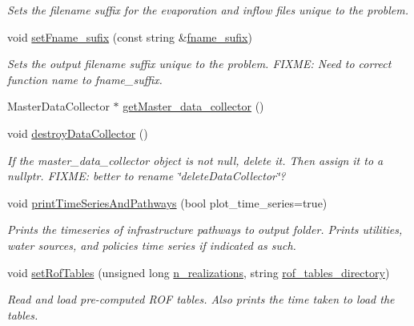 \begin{DoxyCompactItemize}
\begin{DoxyCompactList}\small\item\em Sets the filename suffix for the evaporation and inflow files unique to the problem. \end{DoxyCompactList}\item 
void \mbox{\hyperlink{classProblem_ad666ae2c231f49103593a7e03a3b58fd}{set\+Fname\+\_\+sufix}} (const string \&\mbox{\hyperlink{classProblem_a59444139a907aaf4c6159caed46c8118}{fname\+\_\+sufix}})
\begin{DoxyCompactList}\small\item\em Sets the output filename suffix unique to the problem. F\+I\+X\+ME\+: Need to correct function name to fname\+\_\+suffix. \end{DoxyCompactList}\item 
Master\+Data\+Collector $\ast$ \mbox{\hyperlink{classProblem_acf10e6a4a54da1aabea1fa8611e598dc}{get\+Master\+\_\+data\+\_\+collector}} ()
\item 
void \mbox{\hyperlink{classProblem_af87d1081eb2a8fa57fa7f2666292fee3}{destroy\+Data\+Collector}} ()
\begin{DoxyCompactList}\small\item\em If the master\+\_\+data\+\_\+collector object is not null, delete it. Then assign it to a nullptr. F\+I\+X\+ME\+: better to rename \char`\"{}delete\+Data\+Collector\char`\"{}? \end{DoxyCompactList}\item 
void \mbox{\hyperlink{classProblem_a9085e0730845262a8a7b9dc26f5f84a1}{print\+Time\+Series\+And\+Pathways}} (bool plot\+\_\+time\+\_\+series=true)
\begin{DoxyCompactList}\small\item\em Prints the timeseries of infrastructure pathways to output folder. Prints utilities, water sources, and policies\textquotesingle{} time series if indicated as such. \end{DoxyCompactList}\item 
void \mbox{\hyperlink{classProblem_aa9debdf28260fd9054f7d6d2ee516f94}{set\+Rof\+Tables}} (unsigned long \mbox{\hyperlink{classProblem_a270a5672643bfe09e52e0f24e1884136}{n\+\_\+realizations}}, string \mbox{\hyperlink{classProblem_abc641b49a4defb0dbabafbf3f9dbca6e}{rof\+\_\+tables\+\_\+directory}})
\begin{DoxyCompactList}\small\item\em Read and load pre-\/computed R\+OF tables. Also prints the time taken to load the tables. \end{DoxyCompactList}\item 

\end{DoxyCompactItemize}
